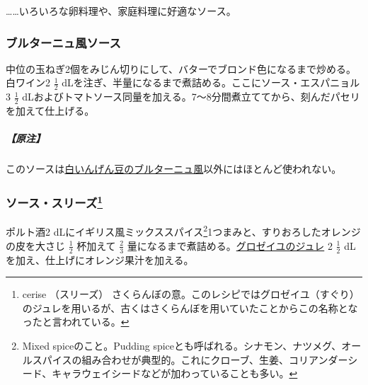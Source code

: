 \begin{recette}
\ldots{}\ldots{}いろいろな卵料理や、家庭料理に好適なソース。

\atoaki{}

\hypertarget{sauce-bretonne}{%
\subsubsection{ブルターニュ風ソース}\label{sauce-bretonne}}



中位の玉ねぎ2個をみじん切りにして、バターでブロンド色になるまで炒める。白ワイン2
\(\frac{1}{2}\)
dLを注ぎ、半量になるまで煮詰める。ここにソース・エスパニョル3
\(\frac{1}{2}\)
dLおよびトマトソース同量を加える。7〜8分間煮立ててから、刻んだパセリを加えて仕上げる。

\hypertarget{nota-sauce-bretonne}{%
\subparagraph{【原注】}\label{nota-sauce-bretonne}}

このソースは\protect\hyperlink{haricots-blancs-bretonne}{白いんげん豆のブルターニュ風}以外にはほとんど使われない。

\atoaki{}

\hypertarget{sauce-aux-cerises}{%
\subsubsection[ソース・スリーズ]{\texorpdfstring{ソース・スリーズ\footnote{cerise
  （スリーズ）
  さくらんぼの意。このレシピではグロゼイユ（すぐり）のジュレを用いるが、古くはさくらんぼを用いていたことからこの名称となったと言われている。}}{ソース・スリーズ}}\label{sauce-aux-cerises}}


 

ポルト酒2 dLにイギリス風ミックススパイス\footnote{Mixed
  spiceのこと。Pudding
  spiceとも呼ばれる。シナモン、ナツメグ、オールスパイスの組み合わせが典型的。これにクローブ、生姜、コリアンダーシード、キャラウェイシードなどが加わっていることも多い。}1つまみと、すりおろしたオレンジの皮を大さじ
\(\frac{1}{2}\) 杯加えて \(\frac{2}{3}\)
量になるまで煮詰める。\protect\hyperlink{gelee-de-groseilles-a}{グロゼイユのジュレ}
2 \(\frac{1}{2}\) dLを加え、仕上げにオレンジ果汁を加える。


\end{recette}
